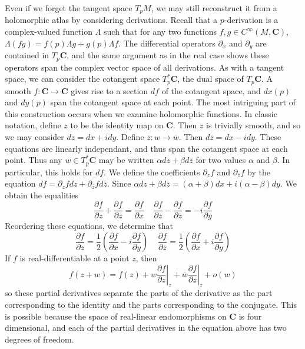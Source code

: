 Even if we forget the tangent space $T_p M$, we may still reconstruct it from a holomorphic atlas by considering derivations. Recall that a $p$-derivation is a complex-valued function $\Lambda$ such that for any two functions $f,g \in C^\infty(M,\mathbf{C})$, $\Lambda (fg) = f(p) \Lambda g + g(p) \Lambda f$. The differential operators $\partial_x$ and $\partial_y$ are contained in $T_p \mathbf{C}$, and the same argument as in the real case shows these operators span the complex vector space of all derivations. As with a tangent space, we can consider the cotangent space $T_p^* \mathbf{C}$, the dual space of $T_p \mathbf{C}$. A smooth $f: \mathbf{C} \to \mathbf{C}$ gives rise to a section $df$ of the cotangent space, and $dx(p)$ and $dy(p)$ span the cotangent space at each point. The most intriguing part of this construction occurs when we examine holomorphic functions. In classic notation, define $z$ to be the identity map on $\mathbf{C}$. Then $z$ is trivially smooth, and so we may consider $dz = dx + i dy$. Define $\overline{z} : w \to \overline{w}$. Then $d\overline{z} = dx - i dy$. These equations are linearly independant, and thus span the cotangent space at each point. Thus any $w \in T_p^* \mathbf{C}$ may be written $\alpha dz + \beta d\overline{z}$ for two values $\alpha$ and $\beta$. In particular, this holds for $df$. We define the coefficients $\partial_z f$ and $\partial_{\overline{z}} f$ by the equation $df = \partial_z f dz + \partial_{\overline{z}} f d\overline{z}$. Since $\alpha dz + \beta d\overline{z} = (\alpha + \beta) dx + i(\alpha - \beta) dy$. We obtain the equalities
%
\[ \frac{\partial f}{\partial z} + \frac{\partial f}{\partial \overline{z}} = \frac{\partial f}{\partial x}\ \ \ \ \ \frac{\partial f}{\partial z} - \frac{\partial f}{\partial \overline{z}} = -i \frac{\partial f}{\partial y} \]
%
Reordering these equations, we determine that
%
\[ \frac{\partial f}{\partial z} = \frac{1}{2} \left( \frac{\partial f}{\partial x} - i \frac{\partial f}{\partial y} \right)\ \ \ \ \ \frac{\partial f}{\partial \overline{z}} = \frac{1}{2} \left( \frac{\partial f}{\partial x} + i \frac{\partial f}{\partial y} \right) \]
%
If $f$ is real-differentiable at a point $z$, then
%
\[ f(z + w) = f(z) + w \left. \frac{\partial f}{\partial z} \right|_z + \overline{w} \left. \frac{\partial f}{\partial \overline{z}} \right|_z + o(w) \]
%
so these partial derivatives separate the parts of the derivative as the part corresponding to the identity and the parts corresponding to the conjugate. This is possible because the space of real-linear endomorphisms on $\mathbf{C}$ is four dimensional, and each of the partial derivatives in the equation above has two degrees of freedom.

